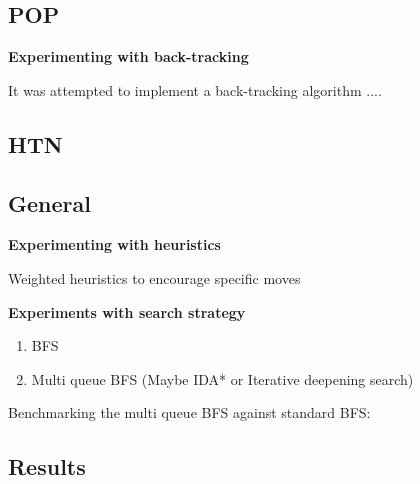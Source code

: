 \documentclass[Main]{subfiles}
\begin{document}
\subsection{POP}

\textbf{Experimenting with back-tracking}

It was attempted to implement a back-tracking algorithm ....






\subsection{HTN}





\subsection{General} 


\textbf{Experimenting with heuristics}

Weighted heuristics to encourage specific moves





\textbf{Experiments with search strategy}

\begin{enumerate}
    \item BFS 
    \item Multi queue BFS (Maybe IDA* or Iterative deepening search)
\end{enumerate}



Benchmarking the multi queue BFS against standard BFS:





\subsection{Results}
\end{document}
